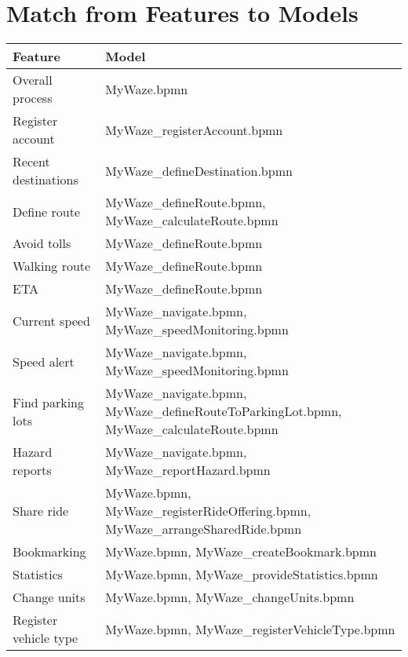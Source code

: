 \documentclass{article}
\begin{document}
\section*{Match from Features to Models}

\begin{longtable}{|>{\raggedright}p{}|>{\raggedright\arraybackslash}p{}|}
\hline
\textbf{Feature} & \textbf{Model} \\
\hline
Overall process & MyWaze.bpmn \\
\hline
Register account & MyWaze\_registerAccount.bpmn \\
\hline
Recent destinations & MyWaze\_defineDestination.bpmn \\
\hline
Define route & MyWaze\_defineRoute.bpmn, MyWaze\_calculateRoute.bpmn \\
\hline
Avoid tolls & MyWaze\_defineRoute.bpmn \\
\hline
Walking route & MyWaze\_defineRoute.bpmn \\
\hline
ETA & MyWaze\_defineRoute.bpmn \\
\hline
Current speed & MyWaze\_navigate.bpmn, MyWaze\_speedMonitoring.bpmn \\
\hline
Speed alert & MyWaze\_navigate.bpmn, MyWaze\_speedMonitoring.bpmn \\
\hline
Find parking lots & MyWaze\_navigate.bpmn, MyWaze\_defineRouteToParkingLot.bpmn, MyWaze\_calculateRoute.bpmn \\
\hline
Hazard reports & MyWaze\_navigate.bpmn, MyWaze\_reportHazard.bpmn \\
\hline
Share ride & MyWaze.bpmn, MyWaze\_registerRideOffering.bpmn, MyWaze\_arrangeSharedRide.bpmn \\
\hline
Bookmarking & MyWaze.bpmn, MyWaze\_createBookmark.bpmn \\
\hline
Statistics & MyWaze.bpmn, MyWaze\_provideStatistics.bpmn \\
\hline
Change units & MyWaze.bpmn, MyWaze\_changeUnits.bpmn \\
\hline
Register vehicle type & MyWaze.bpmn, MyWaze\_registerVehicleType.bpmn \\
\hline
\end{longtable}
\end{document}
